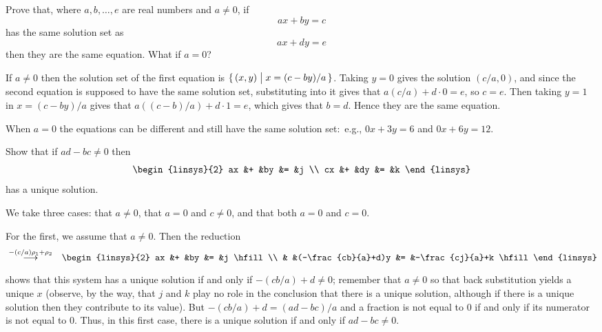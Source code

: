 \begin{exercises}
\begin{answer}
\begin{exparts}
      \end{exparts}  
     \end{answer}
  \item 
    Prove that, where \( a,b,\ldots,e \) are real numbers
    and \( a\neq 0 \), if
    \begin{equation*}
       ax+by=c
    \end{equation*}
    has the same solution set as
    \begin{equation*}
       ax+dy=e
    \end{equation*}
    then they are the same equation.
    What if \( a=0 \)?
    \begin{answer}
      If \( a\neq 0 \) then the solution set of the first equation is
      \( \mbox{$\{\,(x,y)\bigm| x=(c-by)/a\,\}$} \).
      Taking $y=0$ gives the solution $(c/a,0)$, and since the second
      equation is supposed to have the same solution set, substituting into
      it gives that $a(c/a)+d\cdot 0=e$, so $c=e$.
      Then taking $y=1$ in $x=(c-by)/a$ gives that $a((c-b)/a)+d\cdot 1=e$,
      which gives that $b=d$.
      Hence they are the same equation.

      When \( a=0 \) the equations can be different and still have the 
      same solution set:~e.g.,
      \( 0x+3y=6 \) and \( 0x+6y=12 \).   
     \end{answer}
  \recommended \item 
    Show that if \( ad-bc\neq 0 \) then
    \begin{equation*}
      \begin{linsys}{2}
        ax  &+  &by  &=  &j  \\
        cx  &+  &dy  &=  &k  
      \end{linsys}
    \end{equation*}
    has a unique solution.
    \begin{answer}
      We take three cases: that $a\neq 0$, that $a=0$ and 
      $c\neq 0$, and that both $a=0$ and $c=0$.

      For the first, we assume that \( a\neq 0 \).
      Then the reduction
      \begin{eqnarray*}
        &\grstep{-(c/a)\rho_1+\rho_2}
        &\begin{linsys}{2}
          ax  &+  &by                  &=  &j \hfill \\
              &   &(-\frac{cb}{a}+d)y  &=  &-\frac{cj}{a}+k \hfill  
         \end{linsys}
      \end{eqnarray*}
      shows that this system has a unique solution if and only if
      \( -(cb/a)+d\neq 0   \); remember that \( a\neq 0 \) so 
      that back substitution yields a unique \( x \)
      (observe, by the way, that \( j \) and \( k \) play no role in the
      conclusion that there is a unique solution, although if there is a 
      unique solution then they contribute to its value).
      But \( -(cb/a)+d = (ad-bc)/a \) and a fraction is not equal to \( 0 \) 
      if and only if its numerator is not equal to \( 0 \).
      Thus, in this first case, there is a unique solution if and only if
      $ad-bc\neq 0$.


\end{answer}
\end{exercises}
